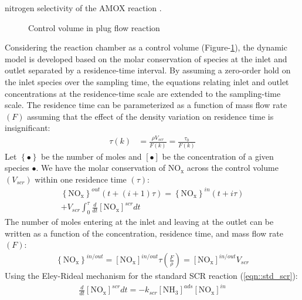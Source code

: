 \documentclass[subscriptcorrection,upint,varvw,barcolor=Goldenrod3,mathalfa=cal=euler,balance,hyphenate,french,pdf-a]{asmejour}
\newcommand{\lr}[1]{\left( #1 \right)}
\newcommand{\lrb}[1]{\left[ #1 \right]}
\newcommand{\lrf}[1]{\left\{ #1 \right\}}
\newcommand{\mol}[1]{\lrf{#1}}
\newcommand{\con}[1]{\lrb{#1}}
\newcommand{\nox}{\text{NO}_{\text{x}}}
\newcommand{\ammonia}{\text{NH}_{3}}
\begin{document}
nitrogen selectivity of the AMOX reaction \cite{jain2023diagnostics}.
\begin{figure}[ht]
    \centering
    \caption{Control volume in plug flow reaction}
    \label{fig:plug-flow}
\end{figure}
Considering the reaction chamber as a control volume (Figure-\ref{fig:plug-flow}), the dynamic model is developed based
on the molar conservation of species at the inlet and outlet separated by a residence-time interval. By assuming a
zero-order hold on the inlet species over the sampling time, the equations relating inlet and outlet concentrations at
the residence-time scale are extended to the sampling-time scale. The residence time can be parameterized as a function of mass flow rate $\lr{F}$ assuming that the effect of the density variation on residence time is insignificant:
\begin{align}
        \tau(k) & = \frac{\rho V_{scr}}{F(k)} = \frac{\tau_0}{F(k)}
        \label{eqn::res_time}
\end{align}
Let $\lrf{\bullet}$ be the number of moles and $\lrb{\bullet}$ be the concentration of a given species $\bullet$. We have the molar conservation of $\nox$ across the control volume $(V_{scr})$ within one residence time $(\tau)$:
\begin{multline}
        \mol{\nox}^{out} (t + (i+1) \tau) =
        \mol{\nox}^{in} (t + i \tau) \\
        + V_{scr} \int_0^{\tau} \frac{d}{dt} \con{\nox}^{scr}dt
        \label{eqn::nox_bal}
\end{multline}
The number of moles entering at the inlet and leaving at the outlet can be written as a function of the concentration, residence time, and mass flow rate $(F)$:
\begin{align}
        \mol{\nox}^{in/out} = \con{\nox}^{in/out} \tau \lr{\frac{F}{\rho}} = \con{\nox}^{in/out} V_{scr}
\end{align}
Using the Eley-Rideal mechanism for the standard SCR reaction (\ref{eqn::std_scr}):
\begin{align}
        \frac{d}{dt} \con{\nox}^{scr}dt = -k_{scr} \con{\ammonia}^{ads} \con{\nox}^{in}
\end{align}
\end{document}
